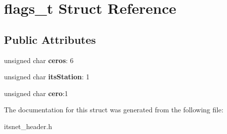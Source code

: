 \hypertarget{structflags__t}{\section{flags\-\_\-t \-Struct \-Reference}
\label{structflags__t}
}
\subsection*{\-Public \-Attributes}
\begin{DoxyCompactItemize}
\item 
\hypertarget{structflags__t_aba34f5f6b2df86da442b88b3f05cee89}{unsigned char {\bfseries ceros}\-: 6}\label{structflags__t_aba34f5f6b2df86da442b88b3f05cee89}

\item 
\hypertarget{structflags__t_acbb89a8751437ebbbe12593118e9aeeb}{unsigned char {\bfseries its\-Station}\-: 1}\label{structflags__t_acbb89a8751437ebbbe12593118e9aeeb}

\item 
\hypertarget{structflags__t_a7d8f7e6f62e50ab0caa459bc4abf53d9}{unsigned char {\bfseries cero}\-:1}\label{structflags__t_a7d8f7e6f62e50ab0caa459bc4abf53d9}

\end{DoxyCompactItemize}


\-The documentation for this struct was generated from the following file\-:\begin{DoxyCompactItemize}
\item 
itsnet\-\_\-header.\-h\end{DoxyCompactItemize}
